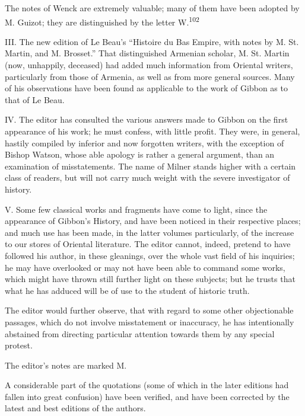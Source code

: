 The notes of Wenck are extremely valuable; many of them have been adopted by
M. Guizot; they are distinguished by the letter W.\textsuperscript{102}


III. The new edition of Le Beau’s “Histoire du Bas Empire, with notes by M.
St. Martin, and M. Brosset.” That distinguished Armenian scholar, M. St.
Martin (now, unhappily, deceased) had added much information from Oriental
writers, particularly from those of Armenia, as well as from more general
sources. Many of his observations have been found as applicable to the work
of Gibbon as to that of Le Beau.

IV. The editor has consulted the various answers made to Gibbon on the first
appearance of his work; he must confess, with little profit. They were, in
general, hastily compiled by inferior and now forgotten writers, with the
exception of Bishop Watson, whose able apology is rather a general argument,
than an examination of misstatements. The name of Milner stands higher with
a certain class of readers, but will not carry much weight with the severe
investigator of history.

V. Some few classical works and fragments have come to light, since the
appearance of Gibbon’s History, and have been noticed in their respective
places; and much use has been made, in the latter volumes particularly, of
the increase to our stores of Oriental literature. The editor cannot, indeed,
pretend to have followed his author, in these gleanings, over the whole vast
field of his inquiries; he may have overlooked or may not have been able to
command some works, which might have thrown still further light on these
subjects; but he trusts that what he has adduced will be of use to the student
of historic truth.

The editor would further observe, that with regard to some other objectionable
passages, which do not involve misstatement or inaccuracy, he has intentionally
abstained from directing particular attention towards them by any special protest.

The editor’s notes are marked M.

A considerable part of the quotations (some of which in the later editions
had fallen into great confusion) have been verified, and have been corrected
by the latest and best editions of the authors.

